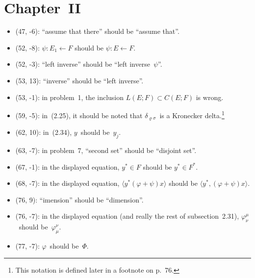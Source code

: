 \documentclass[letterpaper,12pt]{article}
\newcommand{\from}{\leftarrow}
\newcommand{\sprod}[2]{\langle#1,#2\rangle}
\begin{document}
\section*{Chapter~II}
\begin{itemize}
\item (47, -6): ``assume that there'' should be ``assume that''.
\item (52, -8): \(\psi:E_1\from F\) should be \(\psi:E\from F\).
\item (52, -3): ``left inverse'' should be ``left inverse~\(\psi\)''.
\item (53, 13): ``inverse'' should be ``left inverse''.
\item (53, -1): in problem~1, the inclusion \(L(E;F)\subset C(E;F)\) is wrong.
\item (59, -5): in~(2.25), it should be noted that \(\delta_{\varrho\sigma}\)~is a Kronecker delta.\footnote{This notation is defined later in a footnote on p.~76.}
\item (62, 10): in~(2.34), \(y\)~should be~\(y_j\).
\item (63, -7): in problem~7, ``second set'' should be ``disjoint set''.
\item (67, -1): in the displayed equation, \(y^*\in F\) should be \(y^*\in F^*\).
\item (68, -7): in the displayed equation, \(\langle y^*(\varphi+\psi)x\rangle\) should be \(\sprod{y^*}{(\varphi+\psi)x}\).
\item (76, 9): ``imension'' should be ``dimension''.
\item (76, -7): in the displayed equation (and really the rest of subsection~2.31), \(\varphi^{\mu}_{\nu}\)~should be~\(\varphi^{\nu}_{\mu}\).
\item (77, -7): \(\varphi\)~should be~\(\Phi\).
\end{itemize}
\end{document}
